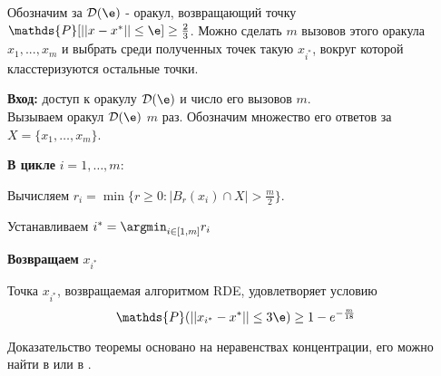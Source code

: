 Обозначим за $\mathcal{D}(\e)$  - оракул, возвращающий точку $\mathds{P}[||x-x^*|| \le \e] \ge \frac23$. Можно сделать $m$ вызовов этого оракула $x_1, ..., x_m$ и выбрать среди полученных точек такую $x_{i^*}$, вокруг которой класстеризуются остальные точки.

\begin{algorithm}[H]
	{\bf Вход:}  доступ к оракулу $\mathcal{D}(\e)$ и число его вызовов $m$. \\
	Вызываем  оракул $\mathcal{D}(\e)$ $m$ раз. Обозначим множество его ответов за  $X=\{x_1,\ldots, x_m\}$.
	
	{\bf В цикле } $i=1,\ldots,m$:
    
	\hspace{20pt} Вычисляем $r_i=\min\{r\geq 0: |B_{r}(x_i)\cap X|>\frac{m}{2}\}$.
	
	 Устанавливаем $i^*=\argmin_{i\in [1,m]} r_i$ 

	 {\bf Возвращаем} $x_{i^*}$		\\
	\caption{Robust Distance Estimation (RDE) $\mathcal{D}(\varepsilon,m)$	%
	}
	\label{alg:rde}
\end{algorithm}



\begin{theorem} \label{th:rde}
Точка $x_{i^*}$, возвращаемая алгоритмом RDE, удовлетворяет условию
\[\mathds{P} (||x_{i^*} - x^*|| \le 3 \e) \ge 1 - e^{-\frac{m}{18}}\]
\end{theorem}

Доказательство теоремы основано на неравенствах концентрации, его можно найти в \cite{nemirovskij1983problem} или в \cite{hsu2016loss}.

